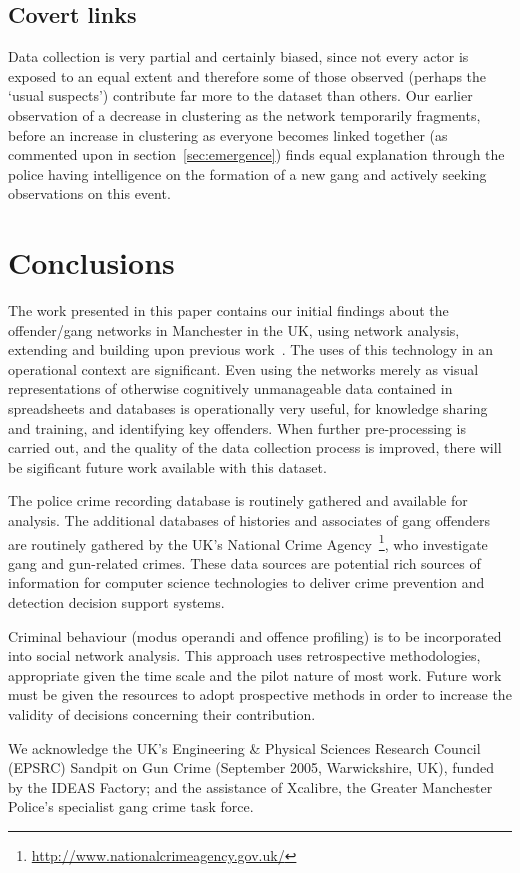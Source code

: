 \documentclass[twocolumn]{svjour3}          %
\theoremstyle{definition}
\begin{document}
\subsection{Covert links}

Data collection is very partial and certainly biased, since not every
actor is exposed to an equal extent and therefore some of those
observed (perhaps the `usual suspects') contribute far more to the
dataset than others. Our earlier observation of a decrease in
clustering as the network temporarily fragments, before an increase in
clustering as everyone becomes linked together (as commented upon in
section~\ref{sec:emergence}) finds equal explanation through the
police having intelligence on the formation of a new gang and actively
seeking observations on this event.

\section{Conclusions}\label{sec:conclusion}

The work presented in this paper contains our initial findings about
the offender/gang networks in Manchester in the UK, using network
analysis, extending and building upon previous
work~\citep{oatley+crick_asonam2014,oatley+crick_fosintsi2014}. The
uses of this technology in an operational context are
significant. Even using the networks merely as visual representations
of otherwise cognitively unmanageable data contained in spreadsheets
and databases is operationally very useful, for knowledge sharing and
training, and identifying key offenders. When further pre-processing
is carried out, and the quality of the data collection process is
improved, there will be sigificant future work available with this
dataset.

The police crime recording database is routinely gathered and
available for analysis. The additional databases of histories and
associates of gang offenders are routinely gathered by the UK's
National Crime
Agency~\footnote{\url{http://www.nationalcrimeagency.gov.uk/}}, who
investigate gang and gun-related crimes. These data sources are
potential rich sources of information for computer science
technologies to deliver crime prevention and detection decision
support systems.

Criminal behaviour (modus operandi and offence profiling) is to be
incorporated into social network analysis.  This approach uses
retrospective methodologies, appropriate given the time scale and the
pilot nature of most work. Future work must be given the resources to
adopt prospective methods in order to increase the validity of
decisions concerning their contribution.

\begin{acknowledgements}
We acknowledge the UK's Engineering \& Physical Sciences Research
Council (EPSRC) Sandpit on Gun Crime (September 2005, Warwickshire,
UK), funded by the IDEAS Factory; and the assistance of Xcalibre, the Greater
Manchester Police's specialist gang crime task force.
\end{acknowledgements}

\end{document}
